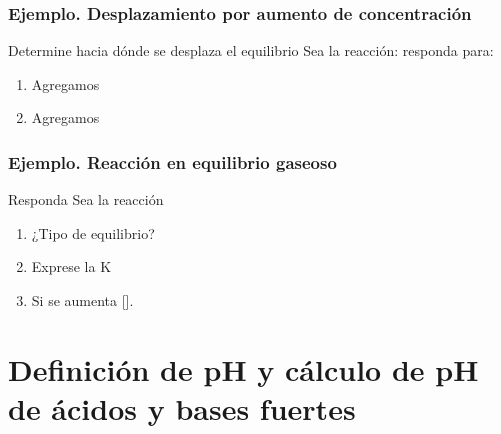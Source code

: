\documentclass[11pt, aspectratio=169, xcolor=table]{beamer}
\begin{document}
\begin{frame}[allowdisplaybreaks]
	\frametitle{Ejemplo. Desplazamiento por aumento de concentración}
	\begin{exampleblock}{Determine hacia dónde se desplaza el equilibrio}
		Sea la reacción:  responda para:
		\begin{enumerate}
			\item Agregamos 
			\item Agregamos 
		\end{enumerate}
	\end{exampleblock}
\end{frame}

\begin{frame}[allowdisplaybreaks]
	\frametitle{Ejemplo. Reacción en equilibrio gaseoso}
	\begin{exampleblock}{Responda}
		Sea la reacción 
		\begin{enumerate}
			\item ¿Tipo de equilibrio?
			\item Exprese la K
			\item Si se aumenta [].
		\end{enumerate}

	\end{exampleblock}
\end{frame}

\section{Definición de pH y cálculo de pH de ácidos y bases fuertes}
\end{document}
